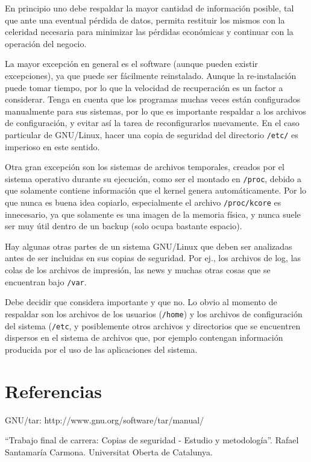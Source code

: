 \documentclass[12pt]{article}
\begin{document}
En principio uno debe respaldar la mayor cantidad de información posible, 
tal que ante una eventual pérdida de datos, permita restituir los mismos 
con la celeridad necesaria para minimizar las pérdidas económicas y 
continuar con la operación del negocio. 

La mayor excepción en general es el software (aunque pueden existir 
excepciones), ya que puede ser fácilmente reinstalado. Aunque la 
re-instalación puede tomar tiempo, por lo que la velocidad de recuperación
es un factor a considerar. 
Tenga en cuenta que los programas muchas veces están configurados 
manualmente para sus sistemas, por lo que es importante respaldar a los 
archivos de configuración, y evitar así la tarea de reconfigurarlos 
nuevamente. En el caso particular de GNU/Linux, hacer una copia de
seguridad del directorio {\tt /etc/} es imperioso en este sentido.

Otra gran excepción son los sistemas de archivos temporales, creados por 
el sistema operativo durante su ejecución, como ser el montado en 
\texttt{/proc}, debido a que solamente contiene información que el kernel
genera automáticamente. Por lo que nunca es buena idea copiarlo, 
especialmente el archivo \texttt{/proc/kcore} es innecesario, ya que 
solamente es una imagen de la memoria física, y nunca suele ser muy útil 
dentro de un backup (solo ocupa bastante espacio).
	
Hay algunas otras partes de un sistema GNU/Linux que deben ser analizadas
 antes de ser incluidas en sus copias de seguridad. Por ej., los archivos 
de log, las colas de los archivos de impresión, las news y muchas otras 
cosas que se encuentran bajo \texttt{/var}. 

Debe decidir que considera importante y que no.  Lo obvio al momento de 
respaldar son los archivos de los usuarios (\texttt{/home}) y los archivos
de configuración del sistema (\texttt{/etc}, y posiblemente otros archivos
y directorios que se encuentren dispersos en el sistema de archivos que, 
por ejemplo contengan información producida por el uso de las aplicaciones
del sistema.



\section*{Referencias}

GNU/tar: http://www.gnu.org/software/tar/manual/

``Trabajo final de carrera: Copias de seguridad - Estudio y metodología''.
Rafael Santamaría Carmona. Universitat Oberta de Catalunya.


\end{document}
